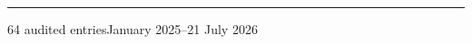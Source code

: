 \documentclass[11pt,a4paper]{article}
\begin{document}
\begin{titlepage}
\begin{minipage}{166mm}
  \vfill
  {\color{Rule}\rule{\linewidth}{0.6pt}}\par\vspace{3mm}
  {\fontsize{8.5}{11}\selectfont\color{Muted}64 audited entries\hfill January 2025--21 July 2026}
  \vspace{8mm}
\end{minipage}
\end{titlepage}
\end{document}
